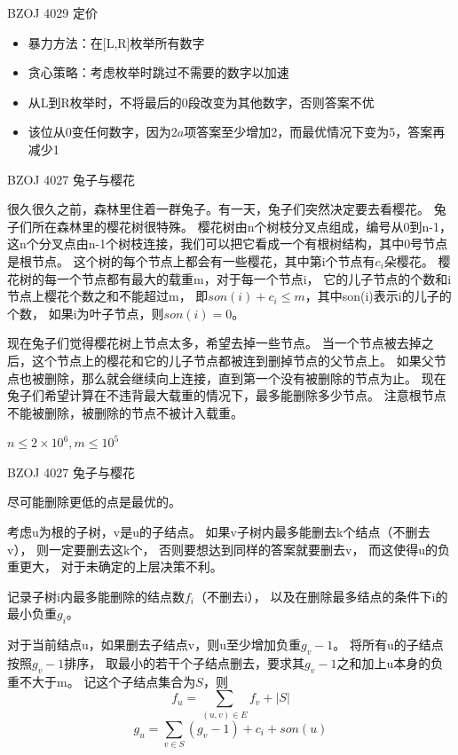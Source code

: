 \documentclass{beamer}
\begin{document}
\begin{frame}{BZOJ 4029 定价}

    \begin{itemize}
        \item 暴力方法：在[L,R]枚举所有数字
        \item 贪心策略：考虑枚举时跳过不需要的数字以加速
        \item 从L到R枚举时，不将最后的0段改变为其他数字，否则答案不优
        \item 该位从0变任何数字，因为$2a$项答案至少增加2，而最优情况下变为5，答案再减少1
    \end{itemize}
    
\end{frame}

\begin{frame}{BZOJ 4027 兔子与樱花}

    很久很久之前，森林里住着一群兔子。有一天，兔子们突然决定要去看樱花。
    兔子们所在森林里的樱花树很特殊。
    樱花树由n个树枝分叉点组成，编号从0到n-1，
    这n个分叉点由n-1个树枝连接，我们可以把它看成一个有根树结构，其中0号节点是根节点。
    这个树的每个节点上都会有一些樱花，其中第i个节点有$c_i$朵樱花。
    樱花树的每一个节点都有最大的载重m，对于每一个节点i，
    它的儿子节点的个数和i节点上樱花个数之和不能超过m，
    即$son(i) + c_i \leq m$，其中son(i)表示i的儿子的个数，
    如果i为叶子节点，则$son(i) = 0$。

    现在兔子们觉得樱花树上节点太多，希望去掉一些节点。
    当一个节点被去掉之后，这个节点上的樱花和它的儿子节点都被连到删掉节点的父节点上。
    如果父节点也被删除，那么就会继续向上连接，直到第一个没有被删除的节点为止。
    现在兔子们希望计算在不违背最大载重的情况下，最多能删除多少节点。
    注意根节点不能被删除，被删除的节点不被计入载重。

    $n\leq 2\times 10^6, m\leq 10^5$
    
\end{frame}

\begin{frame}{BZOJ 4027 兔子与樱花}

    尽可能删除更低的点是最优的。

    考虑u为根的子树，v是u的子结点。
    如果v子树内最多能删去k个结点（不删去v），
    则一定要删去这k个，
    否则要想达到同样的答案就要删去v，
    而这使得u的负重更大，
    对于未确定的上层决策不利。

    记录子树i内最多能删除的结点数$f_i$（不删去i），
    以及在删除最多结点的条件下i的最小负重$g_i$。

    对于当前结点u，如果删去子结点v，则u至少增加负重$g_v-1$。
    将所有u的子结点按照$g_v-1$排序，
    取最小的若干个子结点删去，要求其$g_v-1$之和加上u本身的负重不大于m。
    记这个子结点集合为$S$，则
    $$f_u=\sum_{(u,v)\in E}{f_v}+|S|$$
    $$g_u=\sum_{v \in S}{(g_v-1)}+c_i+son(u)$$
    
\end{frame}
\end{document}
